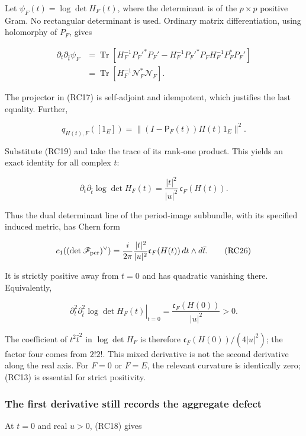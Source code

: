 Let \(\psi_F(t)=\log\det H_F(t)\), where the determinant is of the \(p\times p\) positive Gram. No rectangular determinant is used. Ordinary matrix differentiation, using holomorphy of \(P_F\), gives

\[
\begin{split}
\partial_t\partial_{\bar t}\psi_F
&=\operatorname{Tr}\left[
H_F^{-1}P_F'^*P_F'
-H_F^{-1}P_F'^*P_FH_F^{-1}P_F^*P_F'
\right]\\
&=\operatorname{Tr}\left[H_F^{-1}\mathcal N_F^*\mathcal N_F\right].
\end{split}
\tag{RC23}
\]

The projector in (RC17) is self-adjoint and idempotent, which justifies the last equality. Further,

\[
q_{H(t),F}([1_E])
=\|(I-\mathsf P_F(t))\Pi(t)1_E\|^2.
\tag{RC24}
\]

Substitute (RC19) and take the trace of its rank-one product. This yields an exact identity for all complex \(t\):

\[
\boxed{\partial_t\partial_{\bar t}\log\det H_F(t)
=\frac{|t|^2}{|u|^2}\,\mathfrak c_F(H(t)).}
\tag{RC25}
\]

Thus the dual determinant line of the period-image subbundle, with its specified induced metric, has Chern form

\[
c_1((\det\mathscr F_{\rm per})^\vee)
=\frac{i}{2\pi}\frac{|t|^2}{|u|^2}
\mathfrak c_F(H(t))\,dt\wedge d\bar t.
\tag{RC26}
\]

It is strictly positive away from \(t=0\) and has quadratic vanishing there. Equivalently,

\[
\boxed{\left.\partial_t^2\partial_{\bar t}^2
\log\det H_F(t)\right|_{t=0}
=\frac{\mathfrak c_F(H(0))}{|u|^2}>0.}
\tag{RC27}
\]

The coefficient of \(t^2\bar t^2\) in \(\log\det H_F\) is therefore \(\mathfrak c_F(H(0))/(4|u|^2)\); the factor four comes from \(2!2!\). This mixed derivative is not the second derivative along the real axis. For \(F=0\) or \(F=E\), the relevant curvature is identically zero; (RC13) is essential for strict positivity.

\subsubsection{The first derivative still records the aggregate defect}\label{endpoint-residue_original--the-first-derivative-still-records-the-aggregate-defect}

At \(t=0\) and real \(u>0\), (RC18) gives

